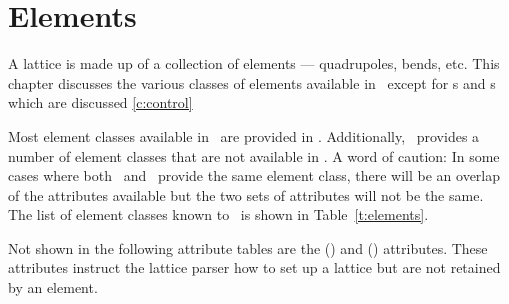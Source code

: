 \chapter{Elements}
\label{c:elements}

A lattice is made up of a collection of elements --- quadrupoles,
bends, etc. This chapter discusses the various classes of elements
available in \bmad\ except for s and s which are
discussed \cref{c:control}

Most element classes available in \mad\ are provided in \bmad.
Additionally, \bmad\ provides a number of element classes that are not
available in \mad.  A word of caution: In some cases where both \mad\
and \bmad\ provide the same element class, there will be an overlap of 
the attributes available but the two sets of attributes will not be the same.
The list of element classes known to \bmad\ is shown in Table~\ref{t:elements}.

Not shown in the following attribute tables are the 
(\sref{s:super}) and \vn{clone} (\sref{s:clone}) attributes.
These attributes instruct the lattice parser how to set up a lattice
but are not retained by an element.


